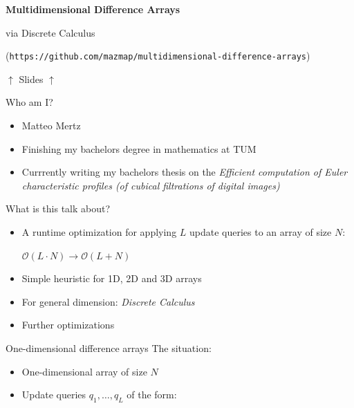 \documentclass[
    t,10pt,
    handout
]{beamer}
\begin{document}
\begin{frame}[plain]
    \centering
    \vfill
    {\fontsize{22}{28}\selectfont\bfseries\color{ScreenshotBlue} Multidimensional Difference Arrays \par}
    \vspace{0.1cm}
    {\fontsize{14}{18}\selectfont\color{TextBlack} via Discrete Calculus \par}
    \vfill
    {\par}
    \vspace{0.2cm}
    (\texttt{https://github.com/mazmap/multidimensional-difference-arrays}) \par
    \vspace{0.1cm}
    \( \uparrow \) Slides \( \uparrow \)
\end{frame}

\begin{frame}{Who am I?}
    \begin{itemize}[<+->] 
        \item Matteo Mertz 
        \item Finishing my bachelors degree in mathematics at TUM 
        \item Currrently writing my bachelors thesis on the \emph{Efficient computation of Euler characteristic profiles (of cubical filtrations of digital images)}
    \end{itemize}
\end{frame}

\begin{frame}{What is this talk about?}
    \begin{itemize}[<+->]
        \item A runtime optimization for applying \( L \) update queries to an array of size \( N \): 
            \begin{center}
                \Large
                \( \mathcal{O}(L\cdot N) \longrightarrow \mathcal{O}(L + N) \)
            \end{center}
        \item Simple heuristic for 1D, 2D and 3D arrays
        \item For general dimension: \emph{Discrete Calculus}
        \item Further optimizations
    \end{itemize}
\end{frame}

\begin{frame}{One-dimensional difference arrays}
    The situation: 
    \begin{itemize}[<+->] 
        \item One-dimensional array of size \( N \) 
        \item Update queries \( q_1, \dots, q_L \) of the form: \\
    \end{itemize}
\end{frame}
\end{document}
